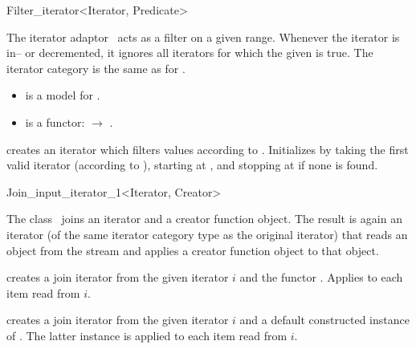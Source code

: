 \begin{ccRefClass}{Filter_iterator<Iterator, Predicate>}
  \label{sectionFilterIterator}

  
  \ccDefinition The iterator adaptor \ccClassTemplateName\ acts as a
  filter on a given range. Whenever the iterator is in-- or
  decremented, it ignores all iterators for which the given
   is true. The iterator category is the same as for
  .

  
  \ccRequirements
  \begin{itemize}
  \item {} is a model for .
  \item {} is a functor:  $\rightarrow$
    .
  \end{itemize}

  \ccCreation

  
  
   {creates an iterator which filters values according to .
    Initializes by taking the first valid iterator (according to ),
    starting at , and stopping at  if none is found.}

\end{ccRefClass}


\begin{ccRefClass}{Join_input_iterator_1<Iterator, Creator>}
  \label{sectionJoinInputIterator}
  
  \ccDefinition The class \ccRefName\ joins an iterator and a creator
  function object. The result is again an iterator (of the same
  iterator category type as the original iterator) that reads an object
  from the stream and applies a creator function object to that
  object.

  
  \ccIsModel {}

  \ccTypes
  
  \ccCreation{}
  
   {creates a join iterator from the given iterator $i$
    and the functor . Applies  to each item
    read from $i$.}

   {creates a join
    iterator from the given iterator $i$ and a default constructed
    instance of . The latter instance is applied to each
    item read from $i$.}

  \ccSeeAlso
\end{ccRefClass}


